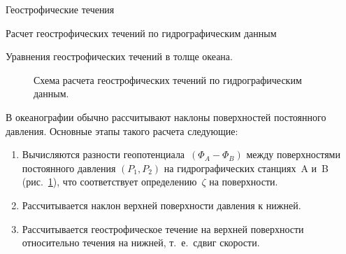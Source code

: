 \begin{chapter}{Геострофические течения}
\begin{section}{Расчет геострофических течений по гидрографическим данным}
\begin{paragraph}{Уравнения геострофических течений в толще океана.}
\begin{figure}[h!]
\caption{Схема расчета геострофических течений по гидрографическим данным.} 
\label{fig:hydrosketch}
\end{figure}
%
%

В океанографии обычно рассчитывают наклоны поверхностей постоянного
давления. Основные этапы такого расчета следующие:
%
\begin{enumerate}
\item
Вычисляются разности геопотенциала~$\left( \Phi_A - \Phi_B \right)$ 
между поверхностями постоянного давления $\left( P_1 , P_2 \right)$ 
на гидрографических станциях~A 
и~B (рис.~\ref{fig:hydrosketch}), что соответствует
определению~$\zeta$ на поверхности.
%

\item
Рассчитывается наклон верхней поверхности давления к нижней.
%

\item
Рассчитывается геострофическое течение на верхней поверхности
относительно течения на нижней, т.~е.\ сдвиг скорости.
%


\end{enumerate}
\end{paragraph}
\end{section}
\end{chapter}
